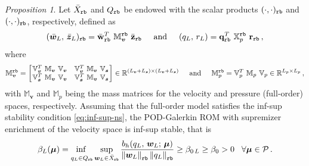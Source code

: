 \documentclass[12pt, a4paper, twoside, openright, notitlepage]{report}
\numberwithin{equation}{chapter}
\theoremstyle{theorem}
\theoremstyle{definition}
\theoremstyle{remark}
\theoremstyle{proposition}
\newtheorem{proposition}{Proposition}[chapter]
\numberwithin{figure}{chapter}
\newcommand{\norm}[1]{\left\lVert#1\right\rVert}
\newcommand{\bg}[1]{\boldsymbol{#1}}
\begin{document}
		\begin{proposition}
			\label{proposition:supremizer-enrichment}
			Let $\bar{X}_{\textup{\texttt{rb}}}$ and $Q_{\textup{\texttt{rb}}}$ be endowed with the scalar products $(\cdot,\cdot)_{\textup{\texttt{rb}}}$ and $(\cdot,\cdot)_{\textup{\texttt{rb}}}$, respectively, defined as
			\begin{equation*}
				(\bar{\bg{w}}_L, \, \bar{\bg{z}}_L)_{\textup{\texttt{rb}}} = \bar{\mathbf{w}}_{\textup{\texttt{rb}}}^T ~ \mathbb{M}_{\bg{v}}^{\textup{\texttt{rb}}} ~ \bar{\mathbf{z}}_{\textup{\texttt{rb}}} \hspace*{0.5cm} \text{and} \hspace*{0.5cm} (q_L, \, r_L) = \mathbf{q}_{\textup{\texttt{rb}}}^T ~ \mathbb{X}_p^{\textup{\texttt{rb}}} ~ \mathbf{r}_{\textup{\texttt{rb}}} \, ,
			\end{equation*}
			where
			\begin{equation*}
				\mathbb{M}_{\bg{v}}^{\textup{\texttt{rb}}} =
				\begin{bmatrix}
				\hspace*{-0.15cm}
				\begin{array}{cc}
					\mathbb{V}_{\bg{v}}^T ~ \mathbb{M}_{\bg{v}} ~ \mathbb{V}_{\bg{v}} & \mathbb{V}_{\bg{v}}^T ~ \mathbb{M}_{\bg{v}} ~ \mathbb{V}_{\bg{s}} \\
					\mathbb{V}_{\bg{s}}^T ~ \mathbb{M}_{\bg{v}} ~ \mathbb{V}_{\bg{v}} & \mathbb{V}_{\bg{s}}^T ~ \mathbb{M}_{\bg{v}} ~ \mathbb{V}_{\bg{s}}
				\end{array} 
				\hspace*{-0.15cm}
				\end{bmatrix} 
				\in \mathbb{R}^{(L_{\bg{v}} + L_{\bg{s}}) \times (L_{\bg{v}} + L_{\bg{s}})} \hspace*{0.5cm} \text{and} \hspace*{0.5cm} \mathbb{M}_p^{\texttt{rb}} = \mathbb{V}_p^T ~ \mathbb{M}_p ~ \mathbb{V}_p \in \mathbb{R}^{L_p \times L_p}\, ,
			\end{equation*}
			with $\mathbb{M}_{\bg{v}}$ and $\mathbb{M}_p$ being the mass matrices for the velocity and pressure (full-order) spaces, respectively. Assuming that the full-order model satisfies the inf-sup stability condition \eqref{eq:inf-sup-ns}, the POD-Galerkin ROM with supremizer enrichment of the velocity space is inf-sup stable, that is
			\begin{equation}
				\label{eq:inf-sup-ns-reduced}
				\beta_L(\bg{\mu}) = \adjustlimits \inf_{q_L \in Q_{\textup{\texttt{rb}}}} \sup_{\bg{w}_L \in \bar{X}_{\textup{\texttt{rb}}}} \dfrac{b_h(q_L, \, \bg{w}_L; \, \bg{\mu})}{\norm{\bg{w}_L}_{\textup{\texttt{rb}}} \norm{q_L}_{\textup{\texttt{rb}}}} \geq \beta_{0\,L} \geq \beta_0 > 0 \hspace*{0.3cm} \forall \bg{\mu} \in \mathcal{P} \, .
			\end{equation}
		\end{proposition}
	
\end{document}
